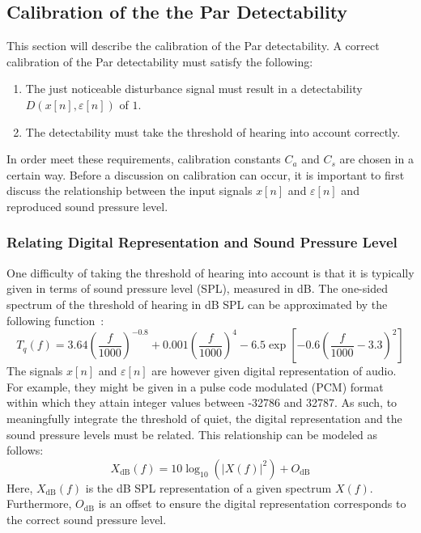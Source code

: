 \subsection{Calibration of the the Par Detectability}
\label{ch:perceptual:implementation:calibration}
This section will describe the calibration of the Par detectability.
A correct calibration of the Par detectability must satisfy the following:
\begin{enumerate}
    \item The just noticeable disturbance signal must result in a detectability $D(x[n],\varepsilon[n])$ of $1$.
    \item The detectability must take the threshold of hearing into account correctly.
\end{enumerate}
In order meet these requirements, calibration constants $C_a$ and $C_s$ are chosen in a certain way.
Before a discussion on calibration can occur, it is important to first discuss the relationship between the input signals
$x[n]$ and $\varepsilon[n]$ and reproduced sound pressure level.

\subsubsection{Relating Digital Representation and Sound Pressure Level}
One difficulty of taking the threshold of hearing into account is that it is typically given in terms of sound pressure level (SPL), measured in dB. 
The one-sided spectrum of the threshold of hearing in dB SPL can be approximated by the following function~\cite{painter2000perceptual}:
\begin{equation}
    T_q(f) = 3.64\left(\frac{f}{1000}\right)^{-0.8} + 0.001\left(\frac{f}{1000}\right)^4 - 6.5\exp\left[-0.6\left(\frac{f}{1000}-3.3\right)^2\right]
\end{equation}
The signals $x[n]$ and $\varepsilon[n]$ are however given digital representation of audio. 
For example, they might be given in a pulse code modulated (PCM) format within which they attain integer values between -32786 and 32787.
As such, to meaningfully integrate the threshold of quiet, the digital representation and the sound pressure levels must be related.
This relationship can be modeled as follows:
\begin{equation}
    X_\text{dB}(f) = 10\log_{10}(\left|X(f)\right|^2) + O_\text{dB}
\end{equation}
Here, $X_\text{dB}(f)$ is the dB SPL representation of a given spectrum $X(f)$.
Furthermore, $O_\text{dB}$ is an offset to ensure the digital representation corresponds to the correct sound pressure level. 


